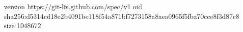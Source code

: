 version https://git-lfs.github.com/spec/v1
oid sha256:d5314cd18e2b4091be118f54a871bf7273158a8aea0965f5fba70cce8f3d87c8
size 1048672
